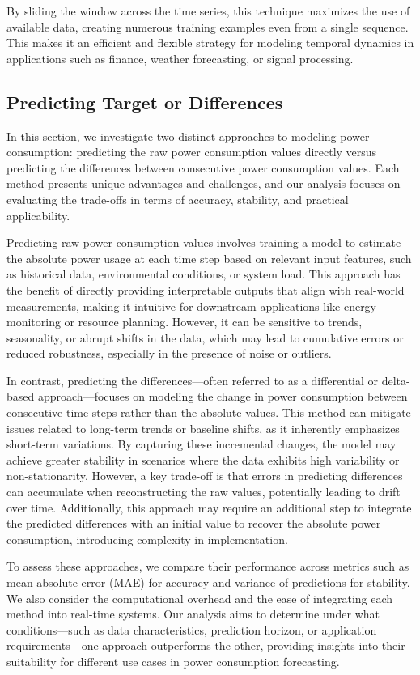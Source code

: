 	By sliding the window across the time series, this technique maximizes the use of available data, creating numerous training examples even from a single sequence. This makes it an efficient and flexible strategy for modeling temporal dynamics in applications such as finance, weather forecasting, or signal processing.

	\subsection{Predicting Target or Differences}
	In this section, we investigate two distinct approaches to modeling power consumption: predicting the raw power consumption values directly versus predicting the differences between consecutive power consumption values. Each method presents unique advantages and challenges, and our analysis focuses on evaluating the trade-offs in terms of accuracy, stability, and practical applicability.
	
	Predicting raw power consumption values involves training a model to estimate the absolute power usage at each time step based on relevant input features, such as historical data, environmental conditions, or system load. This approach has the benefit of directly providing interpretable outputs that align with real-world measurements, making it intuitive for downstream applications like energy monitoring or resource planning. However, it can be sensitive to trends, seasonality, or abrupt shifts in the data, which may lead to cumulative errors or reduced robustness, especially in the presence of noise or outliers.
	
	In contrast, predicting the differences—often referred to as a differential or delta-based approach—focuses on modeling the change in power consumption between consecutive time steps rather than the absolute values. This method can mitigate issues related to long-term trends or baseline shifts, as it inherently emphasizes short-term variations. By capturing these incremental changes, the model may achieve greater stability in scenarios where the data exhibits high variability or non-stationarity. However, a key trade-off is that errors in predicting differences can accumulate when reconstructing the raw values, potentially leading to drift over time. Additionally, this approach may require an additional step to integrate the predicted differences with an initial value to recover the absolute power consumption, introducing complexity in implementation.
	
	To assess these approaches, we compare their performance across metrics such as mean absolute error (MAE) for accuracy and variance of predictions for stability. We also consider the computational overhead and the ease of integrating each method into real-time systems. Our analysis aims to determine under what conditions—such as data characteristics, prediction horizon, or application requirements—one approach outperforms the other, providing insights into their suitability for different use cases in power consumption forecasting.
	
